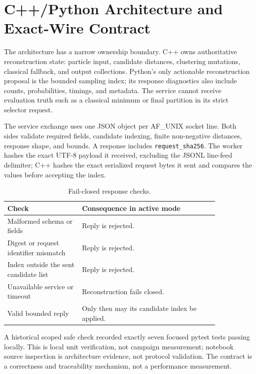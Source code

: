 \section{C++/Python Architecture and Exact-Wire Contract}
The architecture has a narrow ownership boundary. C++ owns authoritative reconstruction state: particle input, candidate distances, clustering mutations, classical fallback, and output collections. Python's only actionable reconstruction proposal is the bounded sampling index; its response diagnostics also include counts, probabilities, timings, and metadata. The service cannot receive evaluation truth such as a classical minimum or final partition in its strict selector request.


The service exchange uses one JSON object per AF\_UNIX socket line. Both sides validate required fields, candidate indexing, finite non-negative distances, response shape, and bounds. A response includes \texttt{request\_sha256}. The worker hashes the exact UTF-8 payload it received, excluding the JSONL line-feed delimiter; C++ hashes the exact serialized request bytes it sent and compares the values before accepting the index.

\begin{table}[htbp]\centering\small
\caption{Fail-closed response checks.}\begin{tabular}{L{0.30\linewidth}L{0.55\linewidth}}\toprule
Check & Consequence in active mode\\\midrule
Malformed schema or fields & Reply is rejected.\\
Digest or request identifier mismatch & Reply is rejected.\\
Index outside the sent candidate list & Reply is rejected.\\
Unavailable service or timeout & Reconstruction fails closed.\\
Valid bounded reply & Only then may its candidate index be applied.\\\bottomrule
\end{tabular}\end{table}

\measured A historical scoped safe check recorded exactly seven focused pytest tests passing locally. This is local unit verification, not campaign measurement; notebook source inspection is architecture evidence, not protocol validation. The contract is a correctness and traceability mechanism, not a performance measurement.
\clearpage
